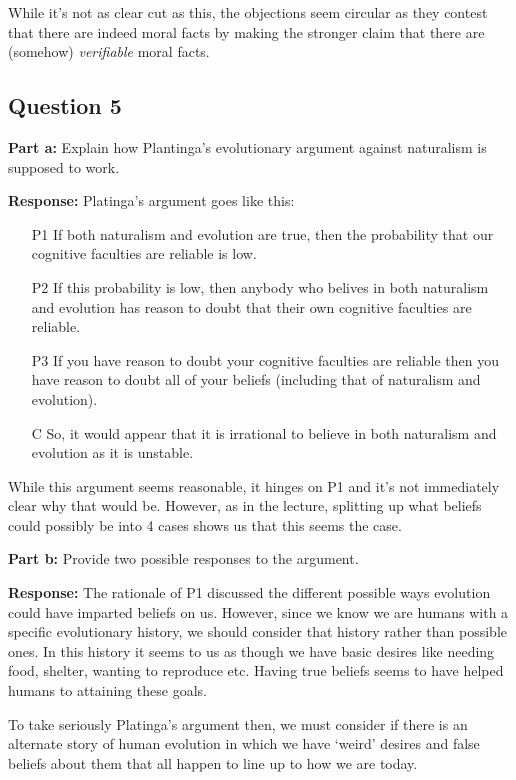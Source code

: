 \documentclass{article}
\begin{document}
While it's not as clear cut as this, the objections seem circular as they contest that there are indeed moral facts by making the stronger claim that there are (somehow) \textit{verifiable} moral facts.

\subsection*{Question 5}
\noindent\textbf{Part a:} Explain how Plantinga's evolutionary argument against naturalism is supposed to work.
\bigskip

\noindent\textbf{Response:} Platinga's argument goes like this:
\begin{enumerate}
    \item[P1] If both naturalism and evolution are true, then the probability that our cognitive faculties are reliable is low.
    \item[P2] If this probability is low, then anybody who belives in both naturalism and evolution has reason to doubt that their own cognitive faculties are reliable.
    \item[P3] If you have reason to doubt your cognitive faculties are reliable then you have reason to doubt all of your beliefs (including that of naturalism and evolution). 
    \item[C ] So, it would appear that it is irrational to believe in both naturalism and evolution as it is unstable.
\end{enumerate}

While this argument seems reasonable, it hinges on P1 and it's not immediately clear why that would be. However, as in the lecture, splitting up what beliefs could possibly be into 4 cases shows us that this seems the case.
\bigskip

\noindent\textbf{Part b:} Provide two possible responses to the argument.
\bigskip

\noindent\textbf{Response:} The rationale of P1 discussed the different possible ways evolution could have imparted beliefs on us. However, since we know we are humans with a specific evolutionary history, we should consider that history rather than possible ones. In this history it seems to us as though we have basic desires like needing food, shelter, wanting to reproduce etc. Having true beliefs seems to have helped humans to attaining these goals.

To take seriously Platinga's argument then, we must consider if there is an alternate story of human evolution in which we have `weird' desires and false beliefs about them that all happen to line up to how we are today.
\end{document}
